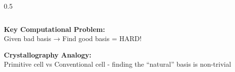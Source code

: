 \documentclass[aspectratio=169,10pt]{beamer}
\newcommand{\teaching}[1]{}
\theoremstyle{plain}
\begin{document}
\begin{frame}
\begin{columns}[T]
\begin{column}{0.5\textwidth}
  
    \end{column}
  \end{columns}
  
  \vspace{0.5cm}
  
  \begin{redBox}
    \textbf{Key Computational Problem:}\\
    Given bad basis → Find good basis = HARD!
  \end{redBox}
  
  \begin{greenBox}
    \textbf{Crystallography Analogy:}\\
    Primitive cell vs Conventional cell - finding the ``natural'' basis is non-trivial
  \end{greenBox}
  
  \teaching{Introduce the basis reduction challenge}
\end{frame}
\end{document}
